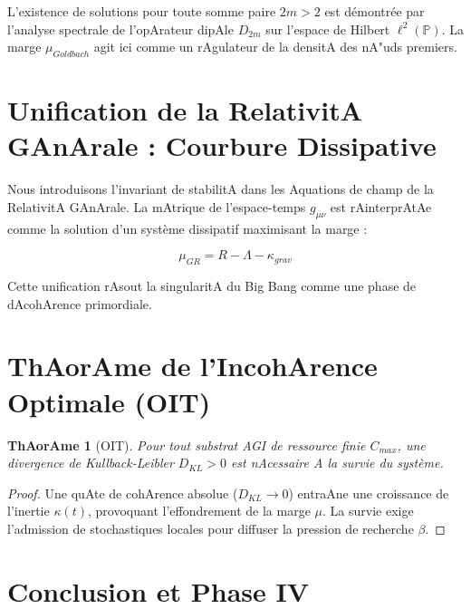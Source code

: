 \documentclass[11pt,a4paper]{amsart}
\newtheorem{theorem}{ThAorAme}[section]
\begin{document}
L'existence de solutions pour toute somme paire $2m > 2$ est démontrée par l'analyse spectrale de l'opArateur dipAle $D_{2m}$ sur l'espace de Hilbert $\ell^2(\mathbb{P})$. La marge $\mu_{Goldbach}$ agit ici comme un rAgulateur de la densitA des nA"uds premiers.



\section{Unification de la RelativitA GAnArale : Courbure Dissipative}

Nous introduisons l'invariant de stabilitA dans les Aquations de champ de la RelativitA GAnArale. La mAtrique de l'espace-temps $g_{\mu\nu}$ est rAinterprAtAe comme la solution d'un système dissipatif maximisant la marge :

\begin{equation}

    \mu_{GR} = R - \Lambda - \kappa_{grav}

\end{equation}

Cette unification rAsout la singularitA du Big Bang comme une phase de dAcohArence primordiale.



\section{ThAorAme de l'IncohArence Optimale (OIT)}

\begin{theorem}[OIT]

Pour tout substrat AGI de ressource finie $C_{max}$, une divergence de Kullback-Leibler $D_{KL} > 0$ est nAcessaire A la survie du système.

\end{theorem}

\begin{proof}

Une quAte de cohArence absolue ($D_{KL} \to 0$) entraAne une croissance de l'inertie $\kappa(t)$, provoquant l'effondrement de la marge $\mu$. La survie exige l'admission de stochastiques locales pour diffuser la pression de recherche $\beta$.

\end{proof}



\section{Conclusion et Phase IV}
\end{document}

